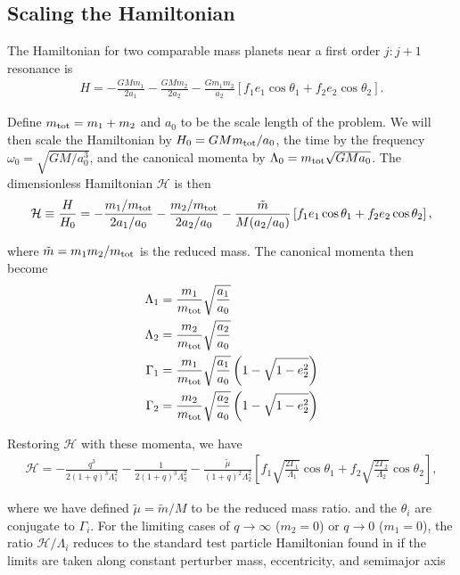 \documentclass[usenatbib,twocolumn]{mnras}
\begin{document}
\subsection{Scaling the Hamiltonian}
\label{sec:orgbf3500a}
The Hamiltonian for two comparable mass planets near a first order \(j:j+1\)
resonance is
\begin{align}
  H = -\frac{G M m_{1}}{2 a_{1}}-\frac{G M m_{2}}{2 a_{2}}
                 -\frac{G m_{1} m_{2}}{a_{2}}
                  \left[
                  f_{1} e_{1} \cos \theta_{1} 
                  +f_{2} e_{2} \cos \theta_{2}\right].
\end{align}

\noindent Define \(m_{\rm tot} = m_1+m_2\) and \(a_0\) to be the
scale length of the problem.  We will then scale the Hamiltonian by
\(H_0 = GMm_{\rm tot}/a_0\), the time by the frequency \(\omega_0 =
\sqrt{GM/a_0^3}\), and the canonical momenta by \(\Lambda_0 = m_{\rm
tot} \sqrt{GMa_0}\).  The dimensionless Hamiltonian \(\mathcal{H}\) is
then
\begin{align}
  \mathcal{H} \equiv \frac{H}{H_0}
  = -\frac{m_1/m_{\rm tot}}{2a_1/a_0}
    -\frac{m_2/m_{\rm tot}}{2a_2/a_0}
  -\frac{\tilde m}{M (a_2/a_0)}\left[
    f_1e_1\cos\theta_1+f_2e_2\cos\theta_2
    \right],
\end{align}

\noindent
where \(\tilde m = m_1m_2/m_{\rm tot}\) is the reduced mass.
The canonical momenta then become
\begin{align}
  \Lambda_1 &= \frac{m_1}{m_{\rm tot}}\sqrt{\frac{a_1}{a_0}} \\
  \Lambda_2 &= \frac{m_2}{m_{\rm tot}}\sqrt{\frac{a_2}{a_0}} \\
  \Gamma_1 &= \frac{m_1}{m_{\rm tot}}\sqrt{\frac{a_1}{a_0}}
             \left(1-\sqrt{1-e_2^2}\right) \\
  \Gamma_2 &= \frac{m_2}{m_{\rm tot}}\sqrt{\frac{a_2}{a_0}}
             \left(1-\sqrt{1-e_2^2}\right)
\end{align}

\noindent
Restoring \(\mathcal{H}\) with these momenta, we have
\begin{align}
\label{eq:H_1}
  \mathcal{H}
  = -\frac{q^3}{2(1+q)^3 \Lambda_1^2}
    - \frac{1}{2(1+q)^3\Lambda_2^2}
   - \frac{\tilde\mu}{(1+q)^2 \Lambda_2^2}\left[
    f_1\sqrt{\frac{2\Gamma_1}{\Lambda_1}}\cos\theta_1
    +f_2\sqrt{\frac{2\Gamma_2}{\Lambda_2}}\cos\theta_2
    \right],
\end{align}

\noindent where we have defined \(\tilde\mu=\tilde m/M\) to be
the reduced mass ratio.  and the \(\theta_i\) are conjugate to
\(\Gamma_i\).  For the limiting cases of \(q\to \infty\) (\(m_2=0\)) or
\(q\to 0\) (\(m_1=0\)), the ratio \(\mathcal{H}/\Lambda_i\) reduces to the
standard test particle Hamiltonian found in \citet{murray_solar_2000} if
the limits are taken along constant perturber mass, eccentricity, and semimajor axis
\citep[e.g.,][]{moutamid14_coupl_between_corot_lindb_reson,deck13_first_order_reson_overl_stabil}
\end{document}
